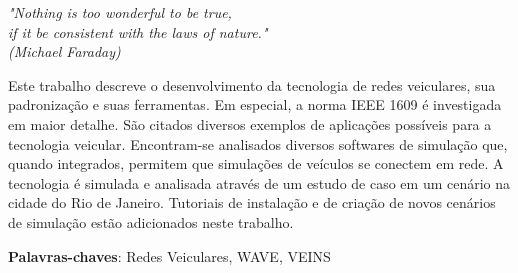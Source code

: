 \documentclass[
12pt,				%
openright,			%
oneside,			%
a4paper,			%
brazil,				%
]{abntex2}
\begin{document}
	\begin{dedicatoria}
		\vspace*{\fill}
		\centering
		\noindent
		\textit{%
			} \vspace*{\fill}
	\end{dedicatoria}
	
	\begin{agradecimentos}
		
		
		
	\end{agradecimentos} 
	
	
	\newpage
	\begin{epigrafe}
		\vspace*{\fill}
		\begin{flushright}
			\textit{"Nothing is too wonderful to be true,\\
				 if it be consistent with the laws of nature."\\
				(Michael Faraday)}
		\end{flushright}
	\end{epigrafe}
	
\setlength{\absparsep}{18pt} %
\begin{resumo}

	\par Este trabalho descreve o desenvolvimento da tecnologia de redes veiculares, sua padronização e suas ferramentas. Em especial, a norma IEEE 1609 é investigada em maior detalhe. São citados diversos exemplos de aplicações possíveis para a tecnologia veicular. Encontram-se analisados diversos softwares de simulação que, quando integrados, permitem que simulações de veículos se conectem em rede. A tecnologia é simulada e analisada através de um estudo de caso em um cenário na cidade do Rio de Janeiro. Tutoriais de instalação e de criação de novos cenários de simulação estão adicionados neste trabalho.

	\vspace{\onelineskip}
			
	\textbf{Palavras-chaves}: Redes Veiculares, WAVE, VEINS
\end{resumo}
	
\end{document}
